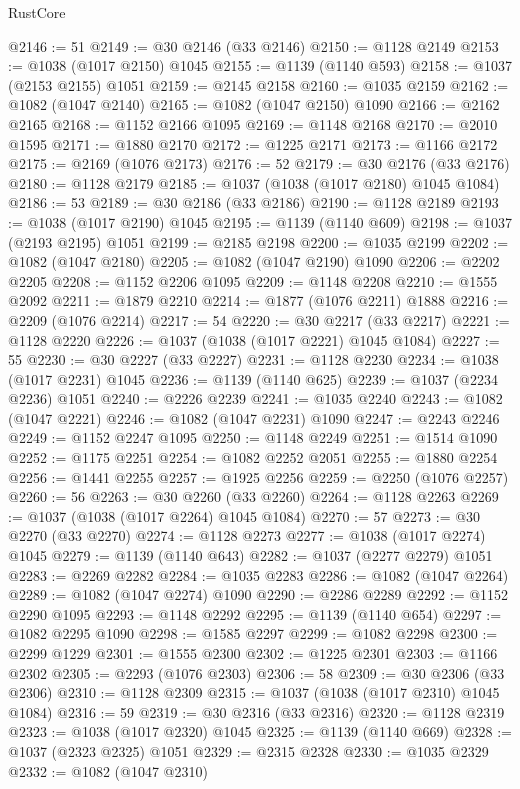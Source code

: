 \begin{lexlean}{RustCore}
\begin{coremodule}
@2146 := 51
@2149 := @30 @2146 (@33 @2146)
@2150 := @1128 @2149
@2153 := @1038 (@1017 @2150) @1045
@2155 := @1139 (@1140 @593)
@2158 := @1037 (@2153 @2155) @1051
@2159 := @2145 @2158
@2160 := @1035 @2159
@2162 := @1082 (@1047 @2140)
@2165 := @1082 (@1047 @2150) @1090
@2166 := @2162 @2165
@2168 := @1152 @2166 @1095
@2169 := @1148 @2168
@2170 := @2010 @1595
@2171 := @1880 @2170
@2172 := @1225 @2171
@2173 := @1166 @2172
@2175 := @2169 (@1076 @2173)
@2176 := 52
@2179 := @30 @2176 (@33 @2176)
@2180 := @1128 @2179
@2185 := @1037 (@1038 (@1017 @2180) @1045 @1084)
@2186 := 53
@2189 := @30 @2186 (@33 @2186)
@2190 := @1128 @2189
@2193 := @1038 (@1017 @2190) @1045
@2195 := @1139 (@1140 @609)
@2198 := @1037 (@2193 @2195) @1051
@2199 := @2185 @2198
@2200 := @1035 @2199
@2202 := @1082 (@1047 @2180)
@2205 := @1082 (@1047 @2190) @1090
@2206 := @2202 @2205
@2208 := @1152 @2206 @1095
@2209 := @1148 @2208
@2210 := @1555 @2092
@2211 := @1879 @2210
@2214 := @1877 (@1076 @2211) @1888
@2216 := @2209 (@1076 @2214)
@2217 := 54
@2220 := @30 @2217 (@33 @2217)
@2221 := @1128 @2220
@2226 := @1037 (@1038 (@1017 @2221) @1045 @1084)
@2227 := 55
@2230 := @30 @2227 (@33 @2227)
@2231 := @1128 @2230
@2234 := @1038 (@1017 @2231) @1045
@2236 := @1139 (@1140 @625)
@2239 := @1037 (@2234 @2236) @1051
@2240 := @2226 @2239
@2241 := @1035 @2240
@2243 := @1082 (@1047 @2221)
@2246 := @1082 (@1047 @2231) @1090
@2247 := @2243 @2246
@2249 := @1152 @2247 @1095
@2250 := @1148 @2249
@2251 := @1514 @1090
@2252 := @1175 @2251
@2254 := @1082 @2252 @2051
@2255 := @1880 @2254
@2256 := @1441 @2255
@2257 := @1925 @2256
@2259 := @2250 (@1076 @2257)
@2260 := 56
@2263 := @30 @2260 (@33 @2260)
@2264 := @1128 @2263
@2269 := @1037 (@1038 (@1017 @2264) @1045 @1084)
@2270 := 57
@2273 := @30 @2270 (@33 @2270)
@2274 := @1128 @2273
@2277 := @1038 (@1017 @2274) @1045
@2279 := @1139 (@1140 @643)
@2282 := @1037 (@2277 @2279) @1051
@2283 := @2269 @2282
@2284 := @1035 @2283
@2286 := @1082 (@1047 @2264)
@2289 := @1082 (@1047 @2274) @1090
@2290 := @2286 @2289
@2292 := @1152 @2290 @1095
@2293 := @1148 @2292
@2295 := @1139 (@1140 @654)
@2297 := @1082 @2295 @1090
@2298 := @1585 @2297
@2299 := @1082 @2298
@2300 := @2299 @1229
@2301 := @1555 @2300
@2302 := @1225 @2301
@2303 := @1166 @2302
@2305 := @2293 (@1076 @2303)
@2306 := 58
@2309 := @30 @2306 (@33 @2306)
@2310 := @1128 @2309
@2315 := @1037 (@1038 (@1017 @2310) @1045 @1084)
@2316 := 59
@2319 := @30 @2316 (@33 @2316)
@2320 := @1128 @2319
@2323 := @1038 (@1017 @2320) @1045
@2325 := @1139 (@1140 @669)
@2328 := @1037 (@2323 @2325) @1051
@2329 := @2315 @2328
@2330 := @1035 @2329
@2332 := @1082 (@1047 @2310)

\end{coremodule}
\end{lexlean}
